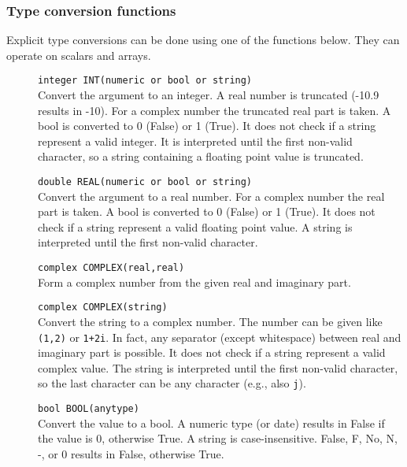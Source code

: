 \subsubsection{Type conversion functions}
Explicit type conversions can be done using one of the functions
below. They can operate on scalars and arrays.
\begin{description}
  \item[] \texttt{integer INT(numeric or bool or string)}\\
    Convert the argument to an integer. A real number is
    truncated (-10.9 results in -10). For a complex number the
    truncated real part is taken. A bool is converted to 0 (False) or 1 (True).
    It does not check if a string represent a valid integer. It is
    interpreted until the first non-valid character, so a string
    containing a floating point value is truncated.
  \item[] \texttt{double REAL(numeric or bool or string)}\\
    Convert the argument to a real number. For a complex number the
    real part is taken. A bool is converted to 0 (False) or 1 (True).
    It does not check if a string represent a valid floating point value.
    A string is interpreted until the first non-valid character.
  \item[] \texttt{complex COMPLEX(real,real)}\\
    Form a complex number from the given real and imaginary part.
  \item[] \texttt{complex COMPLEX(string)}\\
    Convert the string to a complex number. The number can be given
    like \texttt{(1,2)} or \texttt{1+2i}. In fact, any separator
    (except whitespace) between real and imaginary part is possible.
    It does not check if a string represent a valid complex value.
    The string is interpreted until the first non-valid character, so
    the last character can be any character (e.g., also \texttt{j}).
  \item[] \texttt{bool BOOL(anytype)}\\
    Convert the value to a bool. A numeric type (or date) results in False if
    the value is 0, otherwise True.
    A string is case-insensitive. False, F, No, N, -, or 0 results in False, otherwise True.
\end{description}


